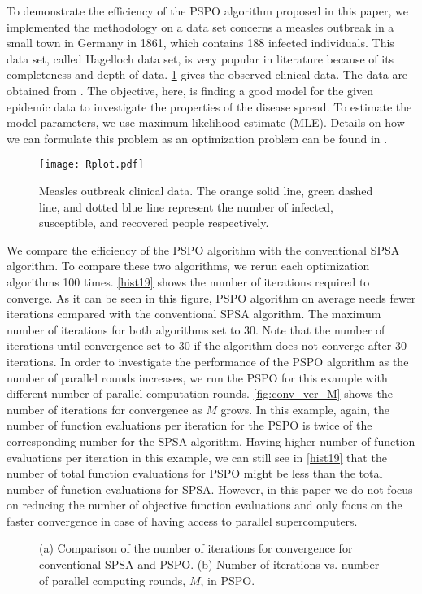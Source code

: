To demonstrate the efficiency of the PSPO algorithm proposed in this paper, we implemented the methodology on a data set concerns a measles outbreak in a small town in Germany in 1861, which contains 188 infected individuals. This data set, called Hagelloch data set, is very popular in literature because of its completeness and depth of data. \cref{Measles1861} gives the observed clinical data. The data are obtained from \cite{meyer2014spatio}. The objective, here, is finding a good model for the given epidemic data to investigate the properties of the disease spread. To estimate the model parameters, we use maximum likelihood estimate (MLE). Details on how we can formulate this problem as an optimization problem can be found in \cite{alaeddini2017application}.
\begin{figure}[!h]
        \centering
        \texttt{[image: Rplot.pdf]}
	\vspace{-5mm}
        \caption{Measles outbreak clinical data. The orange solid line, green dashed line, and dotted blue line represent the number of infected, susceptible, and recovered people respectively.} \label{Measles1861}
\end{figure}

We compare the efficiency of the PSPO algorithm with the conventional SPSA algorithm. To compare these two algorithms, we rerun each optimization algorithms 100 times. \cref{hist19} shows the number of iterations required to converge. As it can be seen in this figure, PSPO algorithm on average needs fewer iterations compared with the conventional SPSA algorithm. The maximum number of iterations for both algorithms set to 30. Note that the number of iterations until convergence set to 30 if the algorithm does not converge after 30 iterations. In order to investigate the performance of the PSPO algorithm as the number of parallel rounds increases, we run the PSPO for this example with different number of parallel computation rounds. \cref{fig:conv_ver_M} shows the number of iterations for convergence as $M$ grows. In this example, again, the number of function evaluations per iteration for the PSPO is twice of the corresponding number for the SPSA algorithm. Having higher number of function evaluations per iteration in this example, we can still see in \cref{hist19} that the number of total function evaluations for PSPO might be less than the total number of function evaluations for SPSA. However, in this paper we do not focus on reducing the number of objective function evaluations and only focus on the faster convergence in case of having access to parallel supercomputers. 
\begin{figure}[!h]
  \centering
	\hfill  
{}
\caption{(a) Comparison of the number of iterations for convergence for conventional SPSA and PSPO. (b) Number of iterations vs. number of parallel computing rounds, $M$, in PSPO.}
\label{fig:test2}
\end{figure}



